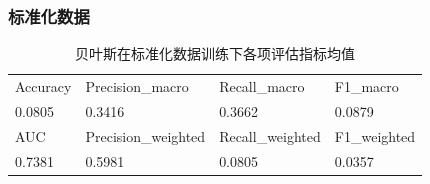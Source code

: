 \documentclass[10pt]{article}
\begin{document}
\subsubsection*{标准化数据}
\begin{table}[H]
  \centering
  \caption{贝叶斯在标准化数据训练下各项评估指标均值}
  \begin{tabular}{llll}
  \toprule
  Accuracy & Precision\_macro & Recall\_macro & F1\_macro \\
  0.0805 & 0.3416 & 0.3662 & 0.0879 \\
  \midrule
  AUC & Precision\_weighted & Recall\_weighted & F1\_weighted \\
  0.7381 & 0.5981 & 0.0805 & 0.0357 \\
  \bottomrule
  \end{tabular}
\end{table}
\end{document}
